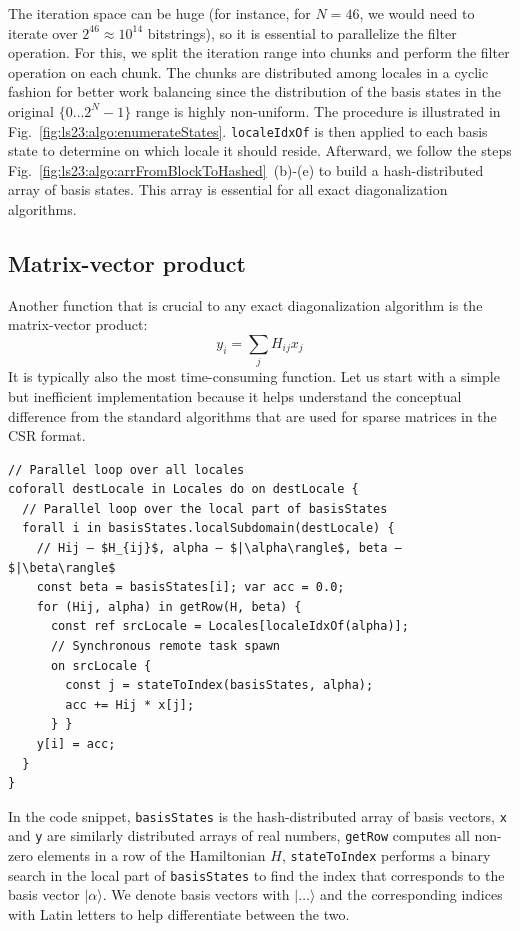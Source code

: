The iteration space can be huge (for instance, for $N=46$, we would need to iterate over $2^{46} \approx 10^{14}$ bitstrings), so it is essential to parallelize the filter operation. For this, we split the iteration range into chunks and perform the filter operation on each chunk. The chunks are distributed among locales in a cyclic fashion for better work balancing since the distribution of the basis states in the original $\{0 \dots 2^N-1\}$ range is highly non-uniform. The procedure is illustrated in Fig.~\ref{fig:ls23:algo:enumerateStates}. \verb|localeIdxOf| is then applied to each basis state to determine on which locale it should reside. Afterward, we follow the steps Fig.~\ref{fig:ls23:algo:arrFromBlockToHashed}~(b)-(e) to build a hash-distributed array of basis states. This array is essential for all exact diagonalization algorithms.

\subsection{Matrix-vector product}\label{sec:ls23:matrix-vector-product}

Another function that is crucial to any exact diagonalization algorithm is the matrix-vector product:
\vspace{-0.1cm}\begin{equation*}
    y_i = \sum_{j} H_{ij} x_j
\end{equation*}
\noindent It is typically also the most time-consuming function. Let us start with a simple but inefficient implementation because it helps understand the conceptual difference from the standard algorithms that are used for sparse matrices in the CSR format.

\begin{verbatim}
// Parallel loop over all locales
coforall destLocale in Locales do on destLocale {
  // Parallel loop over the local part of basisStates
  forall i in basisStates.localSubdomain(destLocale) {
    // Hij — $H_{ij}$, alpha — $|\alpha\rangle$, beta — $|\beta\rangle$
    const beta = basisStates[i]; var acc = 0.0;
    for (Hij, alpha) in getRow(H, beta) {
      const ref srcLocale = Locales[localeIdxOf(alpha)];
      // Synchronous remote task spawn
      on srcLocale {
        const j = stateToIndex(basisStates, alpha);
        acc += Hij * x[j];
      } }
    y[i] = acc;
  }
}
\end{verbatim}

In the code snippet, \verb|basisStates| is the hash-distributed array of basis vectors, \verb|x| and \verb|y| are similarly distributed arrays of real numbers, \verb|getRow| computes all non-zero elements in a row of the Hamiltonian $H$, \verb|stateToIndex| performs a binary search in the local part of \verb|basisStates| to find the index that corresponds to the basis vector $|\alpha\rangle$. We denote basis vectors with $|\dots\rangle$ and the corresponding indices with Latin letters to help differentiate between the two.

